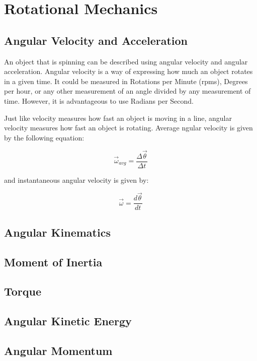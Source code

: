 \chapter{Rotational Mechanics}
	\section{Angular Velocity and Acceleration}
	An object that is spinning can be described using angular velocity and angular acceleration.  Angular velocity is a way of expressing how much an object rotates in a given time.  It could be measured in Rotations per Minute (rpms), Degrees per hour, or any other measurement of an angle divided by any measurement of time.  However, it is advantageous to use Radians per Second.
	
	  Just like velocity measures how fast an object is moving in a line, angular velocity measures how fast an object is rotating.    Average ngular velocity is given by the following equation:
	  	\begin{mdframed}[backgroundcolor=orange!20!white]
	  \begin{equation}
		\vec{\omega}_{avg} = \frac{\Delta \vec{\theta}}{\Delta t}
	  \end{equation}
	\end{mdframed}
	and instantaneous angular velocity is given by: 
	  	\begin{mdframed}[backgroundcolor=orange!20!white]
	\begin{equation}
	\vec{\omega} = \frac{d \vec{\theta}}{d t}
	\end{equation}
\end{mdframed}


	\section{Angular Kinematics}
	\section{Moment of Inertia}
	
	\section{Torque}
	\section{Angular Kinetic Energy}
	
	\newpage
	\section{Angular Momentum} \label{angularmomentum} 
